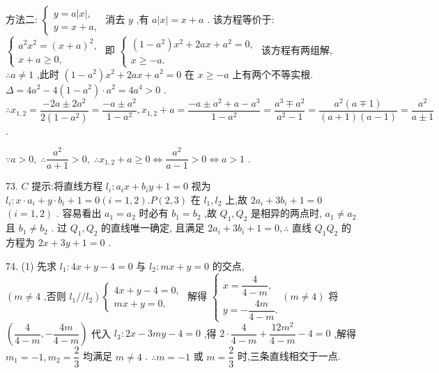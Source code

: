 方法二: $\left\{  \begin{array}{l} y = a\left| x\right| , \\  y = x + a, \end{array}\right.$ 消去 $y$ ,有 $a\left| x\right|  = x + a$ . 该方程等价于: $\left\{  \begin{array}{l} {a}^{2}{x}^{2} = {\left( x + a\right) }^{2}, \\  x + a \geq  0, \end{array}\right.$ 即 $\left\{  \begin{array}{l} \left( {1 - {a}^{2}}\right) {x}^{2} + {2ax} + {a}^{2} = 0, \\  x \geq   - a. \end{array}\right.$ 该方程有两组解, $\therefore a \neq  1$ ,此时 $\left( {1 - {a}^{2}}\right) {x}^{2} + {2ax} + {a}^{2} = 0$ 在 $x \geq   - a$ 上有两个不等实根. $\Delta  = 4{a}^{2} - 4\left( {1 - {a}^{2}}\right)  \cdot  {a}^{2} = 4{a}^{4} > 0$ . $\therefore {x}_{1,2} = \dfrac{-{2a} \pm  2{a}^{2}}{2\left( {1 - {a}^{2}}\right) } = \dfrac{-a \pm  {a}^{2}}{1 - {a}^{2}},{x}_{1,2} + a = \dfrac{-a \pm  {a}^{2} + a - {a}^{3}}{1 - {a}^{2}} = \dfrac{{a}^{3} \mp  {a}^{2}}{{a}^{2} - 1} = \dfrac{{a}^{2}\left( {a \mp  1}\right) }{\left( {a + 1}\right) \left( {a - 1}\right) } = \dfrac{{a}^{2}}{a \pm  1}$ .

$\because a > 0,\;\therefore \dfrac{{a}^{2}}{a + 1} > 0,\;\therefore {x}_{1,2} + a \geq  0 \Leftrightarrow  \dfrac{{a}^{2}}{a - 1} > 0 \Leftrightarrow  a > 1$ .

73. $C$ 提示:将直线方程 ${l}_{i} : {a}_{i}x + {b}_{i}y + 1 = 0$ 视为 ${l}_{i} : x \cdot  {a}_{i} + y \cdot  {b}_{i} + 1 = 0\left( {i = 1,2}\right) .P\left( {2,3}\right)$ 在 ${l}_{1},{l}_{2}$ 上,故 $2{a}_{i} + 3{b}_{i} + 1 = 0$  $\left( {i = 1,2}\right)$ . 容易看出 ${a}_{1} = {a}_{2}$ 时必有 ${b}_{1} = {b}_{2}$ ,故 ${Q}_{1},{Q}_{2}$ 是相异的两点时, ${a}_{1} \neq  {a}_{2}$ 且 ${b}_{1} \neq  {b}_{2}$ . 过 ${Q}_{1},{Q}_{2}$ 的直线唯一确定, 且满足 $2{a}_{i} + 3{b}_{i} + 1 = 0,\therefore$ 直线 ${Q}_{1}{Q}_{2}$ 的方程为 ${2x} + {3y} + 1 = 0$ .

74. (1) 先求 ${l}_{1} : {4x} + y - 4 = 0$ 与 ${l}_{2} : {mx} + y = 0$ 的交点, $\left( {m \neq  4\text{ ,否则 }{l}_{1}//{l}_{2}}\right) \left\{  \begin{array}{l} {4x} + y - 4 = 0, \\  {mx} + y = 0, \end{array}\right.$ 解得 $\left\{  \begin{array}{l} x = \dfrac{4}{4 - m}, \\  y =  - \dfrac{4m}{4 - m}. \end{array}\right. \left( {m \neq  4}\right)$ 将 $\left( {\dfrac{4}{4 - m}, - \dfrac{4m}{4 - m}}\right)$ 代入 ${l}_{3} : {2x} - {3my} - 4 = 0$ ,得 $2 \cdot  \dfrac{4}{4 - m} + \dfrac{{12}{m}^{2}}{4 - m} - 4 = 0$ ,解得 ${m}_{1} =  - 1,{m}_{2} = \dfrac{2}{3}$ 均满足 $m \neq  4$ . $\therefore m =  - 1$ 或 $m = \dfrac{2}{3}$ 时,三条直线相交于一点.

